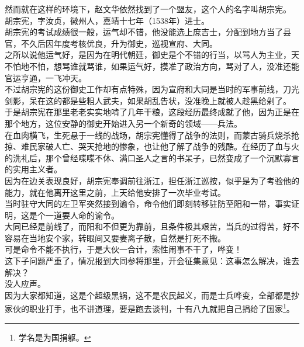 \begin{multicols}{\theparacolNo}
然而就在这样的环境下，赵文华依然找到了一个盟友，这个人的名字叫胡宗宪。\\

胡宗宪，字汝贞，徽州人，嘉靖十七年（1538年）进士。\\

胡宗宪的考试成绩很一般，运气却不错，他没能选上庶吉士，分配到地方当了县官，不久后因年度考核优良，升为御史，巡视宣府、大同。\\

之所以说他运气好，是因为在明代朝廷，御史是个不错的行当，以骂人为主业，天不怕地不怕，想骂谁就骂谁，如果运气好，摸准了政治方向，骂对了人，没准还能官运亨通，一飞冲天。\\

不过胡宗宪的这份御史工作却有点特殊，因为宣府和大同是当时的军事前线，刀光剑影，呆在这的都是些粗人武夫，如果胡乱告状，没准晚上就被人趁黑给剁了。\\

于是胡宗宪在那里老老实实地啃了几年干粮，这段经历最终成就了他，因为正是在那个地方，这位安静的御史开始进入另一个新奇的领域——兵法。\\

在血肉横飞，生死悬于一线的战场，胡宗宪懂得了战争的法则，而蒙古骑兵烧杀抢掠、难民家破人亡、哭天抢地的惨象，也让他了解了战争的残酷。在经历了血与火的洗礼后，那个曾经喋喋不休、满口圣人之言的书呆子，已然变成了一个沉默寡言的实用主义者。\\

因为在边关表现良好，胡宗宪奉调前往浙江，担任浙江巡按，似乎是为了考验他的能力，就在他离开这里之前，上天给他安排了一次毕业考试。\\

当时驻守大同的左卫军突然接到谕令，命令他们即刻转移驻防至阳和一带，事实证明，这是个一道要人命的谕令。\\

大同已经是前线了，而阳和不但更为靠前，且条件极其艰苦，当兵的过得苦，好不容易在当地安个家，转眼间又要妻离子散，自然是打死不搬。\\

可是命令不能不执行，于是大伙一合计，索性闹事不干了，哗变！\\

这下子问题严重了，情况报到大同参将那里，开会征集意见：这事怎么解决，谁去解决？\\

没人应声。\\

因为大家都知道，这是个超级黑锅，这不是农民起义，而是士兵哗变，全部都是抄家伙的职业打手，也不讲道理，要是跑去谈判，十有八九就把自己捐给了国家\footnote{学名是为国捐躯。}。\\


\end{multicols}
